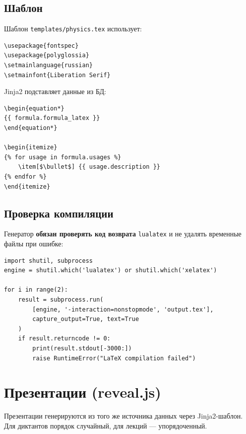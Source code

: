 \documentclass[12pt,a4paper]{article}
\newcommand{\code}[1]{\texttt{#1}}
\begin{document}
\subsection{Шаблон}

Шаблон \code{templates/physics.tex} использует:

\begin{verbatim}
\usepackage{fontspec}
\usepackage{polyglossia}
\setmainlanguage{russian}
\setmainfont{Liberation Serif}
\end{verbatim}

\noindent
Jinja2 подставляет данные из БД:

\begin{verbatim}
\begin{equation*}
{{ formula.formula_latex }}
\end{equation*}

\begin{itemize}
{% for usage in formula.usages %}
    \item[$\bullet$] {{ usage.description }}
{% endfor %}
\end{itemize}
\end{verbatim}

\subsection{Проверка компиляции}

Генератор \textbf{обязан проверять код возврата} \code{lualatex}
и не удалять временные файлы при ошибке:

\begin{verbatim}
import shutil, subprocess
engine = shutil.which('lualatex') or shutil.which('xelatex')

for i in range(2):
    result = subprocess.run(
        [engine, '-interaction=nonstopmode', 'output.tex'],
        capture_output=True, text=True
    )
    if result.returncode != 0:
        print(result.stdout[-3000:])
        raise RuntimeError("LaTeX compilation failed")
\end{verbatim}

\section{Презентации (reveal.js)}

Презентации генерируются из того же источника данных через
Jinja2-шаблон. Для диктантов порядок случайный, для лекций ---
упорядоченный.
\end{document}
